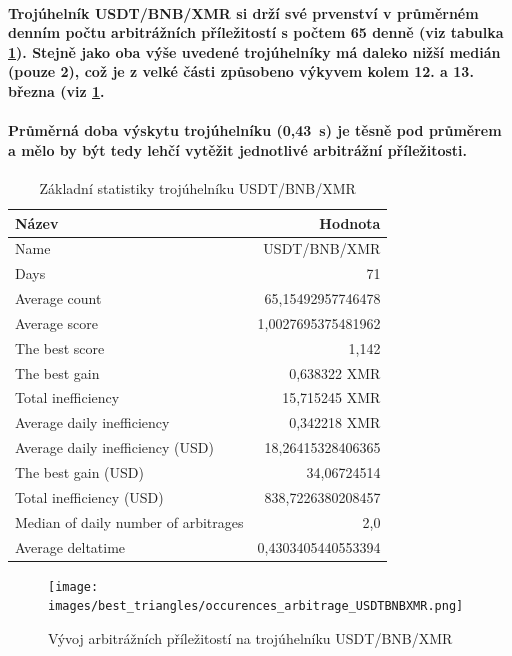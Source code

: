 \documentclass[thesis=B,czech]{FITthesis}[2019/03/21]
\begin{document}
\paragraph{
Trojúhelník USDT/BNB/XMR si drží své prvenství v průměrném denním počtu arbitrážních příležitostí s počtem 65 denně (viz tabulka \ref{USDTBNBXMR_stats}). Stejně jako oba výše uvedené trojúhelníky má daleko nižší medián (pouze 2), což je z velké části způsobeno výkyvem kolem 12. a 13. března (viz \ref{occurences_arbitrage_USDTBNBXMR}.
}
\paragraph{
Průměrná doba výskytu trojúhelníku (0,43~s) je těsně pod průměrem a mělo by být tedy lehčí vytěžit jednotlivé arbitrážní příležitosti.
}
\begin{table}\centering
\caption{Základní statistiky trojúhelníku USDT/BNB/XMR}
\label{USDTBNBXMR_stats}
\begin{tabular}{|| l | r ||}
\hline Název & Hodnota \\ 
\hline\hline Name & USDT/BNB/XMR \\ 
\hline Days & 71 \\ 
\hline Average count & 65,15492957746478 \\ 
\hline Average score & 1,0027695375481962 \\ 
\hline The best score & 1,142 \\ 
\hline The best gain & 0,638322 XMR \\ 
\hline Total inefficiency & 15,715245 XMR \\ 
\hline Average daily inefficiency & 0,342218 XMR \\ 
\hline Average daily inefficiency (USD) & 18,26415328406365 \\ 
\hline The best gain (USD) & 34,06724514 \\ 
\hline Total inefficiency (USD) & 838,7226380208457 \\ 
\hline Median of daily number of arbitrages & 2,0 \\ 
\hline Average deltatime & 0,4303405440553394 \\ 
\hline
\end{tabular}
\end{table}

\begin{figure}\centering
	\texttt{[image: images/best\_triangles/occurences\_arbitrage\_USDTBNBXMR.png]}
	\caption{Vývoj arbitrážních příležitostí na trojúhelníku USDT/BNB/XMR }\label{occurences_arbitrage_USDTBNBXMR}
\end{figure}
\end{document}
